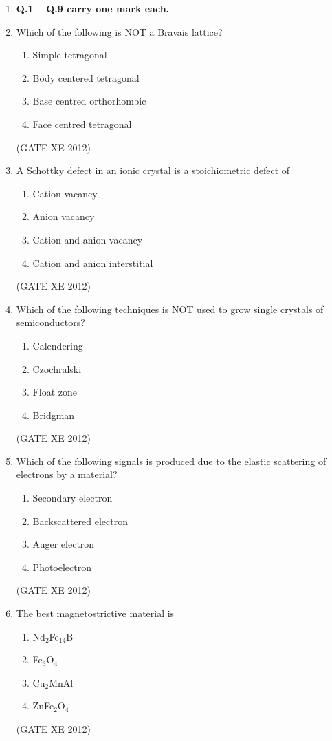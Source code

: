\documentclass[12pt]{article}
\begin{document}
\begin{enumerate}
\item[] \textbf{Q.1 – Q.9 carry one mark each.}

\item Which of the following is NOT a Bravais lattice?
\begin{enumerate}
\item Simple tetragonal
\item Body centered tetragonal
\item Base centred orthorhombic
\item Face centred tetragonal
\end{enumerate}
(GATE XE 2012)

\item A Schottky defect in an ionic crystal is a stoichiometric defect of
\begin{enumerate}
\item Cation vacancy
\item Anion vacancy
\item Cation and anion vacancy
\item Cation and anion interstitial
\end{enumerate}
(GATE XE 2012)

\item Which of the following techniques is NOT used to grow single crystals of semiconductors?
\begin{multicols}{4}
\begin{enumerate}
\item Calendering
\item Czochralski
\item Float zone
\item Bridgman
\end{enumerate}
\end{multicols}
(GATE XE 2012)

\item Which of the following signals is produced due to the elastic scattering of electrons by a material?
\begin{enumerate}
\item Secondary electron
\item Backscattered electron
\item Auger electron
\item Photoelectron
\end{enumerate}
(GATE XE 2012)

\item The best magnetostrictive material is
\begin{multicols}{4}
\begin{enumerate}
\item Nd$_2$Fe$_{14}$B
\item Fe$_3$O$_4$
\item Cu$_2$MnAl
\item ZnFe$_2$O$_4$
\end{enumerate}
\end{multicols}
(GATE XE 2012)


\end{enumerate}
\end{document}
